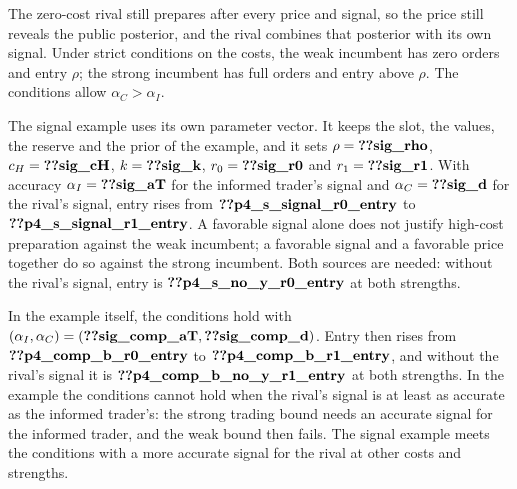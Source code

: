 The zero-cost rival still prepares after every price and signal, so the price still reveals the public
posterior, and the rival combines that posterior with its own signal. Under strict conditions on the costs,
the weak incumbent has zero orders and entry \(\rho\); the strong incumbent has full orders and entry above
\(\rho\). The conditions allow \(\alpha_C>\alpha_I\).

The signal example uses its own parameter vector. It keeps the slot, the values, the reserve and the
prior of the example, and it sets \(\rho=\reg{sig_rho}\), \(c_H=\reg{sig_cH}\), \(k=\reg{sig_k}\),
\(r_0=\reg{sig_r0}\) and \(r_1=\reg{sig_r1}\). With accuracy \(\alpha_I=\reg{sig_aT}\) for the informed trader's signal and
\(\alpha_C=\reg{sig_d}\) for the rival's signal, entry rises from \(\reg{p4_s_signal_r0_entry}\) to \(\reg{p4_s_signal_r1_entry}\).
A favorable signal alone does not justify high-cost preparation against the weak incumbent;
a favorable signal and a favorable price together do so against the strong incumbent. Both sources are needed:
without the rival's signal, entry is \(\reg{p4_s_no_y_r0_entry}\) at both strengths.

In the example itself, the conditions hold with \((\alpha_I,\alpha_C)=(\reg{sig_comp_aT},\reg{sig_comp_d})\).
Entry then rises from \(\reg{p4_comp_b_r0_entry}\) to \(\reg{p4_comp_b_r1_entry}\), and
without the rival's signal it is \(\reg{p4_comp_b_no_y_r1_entry}\) at both strengths. In the example the
conditions cannot hold when the rival's signal is at least as accurate as the informed
trader's: the strong trading bound needs an accurate signal for the informed trader, and the weak bound then
fails. The signal example meets the conditions with a more accurate signal for the rival at other costs and strengths.
